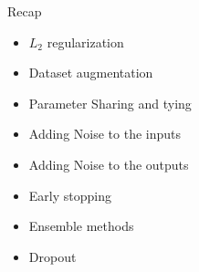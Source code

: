 \begin{frame}
	\vspace{4em}
	\begin{overlayarea}{\textwidth}{\textheight}
		\begin{block}{Recap}
			\begin{itemize}
				\item $L_2$ regularization
				\item Dataset augmentation
				\item Parameter Sharing and tying
				\item Adding Noise to the inputs
				\item Adding Noise to the outputs 
				\item Early stopping
				\item Ensemble methods
				\item Dropout
			\end{itemize}
		\end{block}
	\end{overlayarea}
\end{frame}
				
